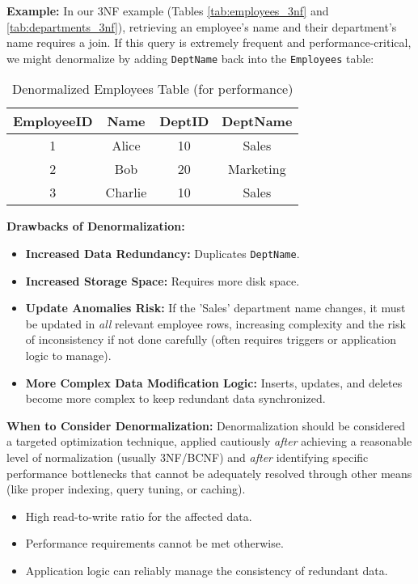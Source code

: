 \documentclass[12pt]{book}
\begin{document}
\textbf{Example:}
In our 3NF example (Tables \ref{tab:employees_3nf} and \ref{tab:departments_3nf}), retrieving an employee's name and their department's name requires a join. If this query is extremely frequent and performance-critical, we might denormalize by adding \texttt{DeptName} back into the \texttt{Employees} table:

\begin{table}[htbp]
\centering
\begin{tabular}{@{}cccc@{}}
\toprule
EmployeeID & Name & DeptID & DeptName \\ %
\midrule
1 & Alice & 10 & Sales \\
2 & Bob & 20 & Marketing \\
3 & Charlie & 10 & Sales \\
\bottomrule
\end{tabular}
\caption{Denormalized Employees Table (for performance)}
\label{tab:denormalized_employees}
\end{table}

\textbf{Drawbacks of Denormalization:}
\begin{itemize}
    \item \textbf{Increased Data Redundancy:} Duplicates \texttt{DeptName}.
    \item \textbf{Increased Storage Space:} Requires more disk space.
    \item \textbf{Update Anomalies Risk:} If the 'Sales' department name changes, it must be updated in \emph{all} relevant employee rows, increasing complexity and the risk of inconsistency if not done carefully (often requires triggers or application logic to manage).
    \item \textbf{More Complex Data Modification Logic:} Inserts, updates, and deletes become more complex to keep redundant data synchronized.
\end{itemize}

\textbf{When to Consider Denormalization:}
Denormalization should be considered a targeted optimization technique, applied cautiously \emph{after} achieving a reasonable level of normalization (usually 3NF/BCNF) and \emph{after} identifying specific performance bottlenecks that cannot be adequately resolved through other means (like proper indexing, query tuning, or caching).
\begin{itemize}
    \item High read-to-write ratio for the affected data.
    \item Performance requirements cannot be met otherwise.
    \item Application logic can reliably manage the consistency of redundant data.
\end{itemize}
\end{document}
